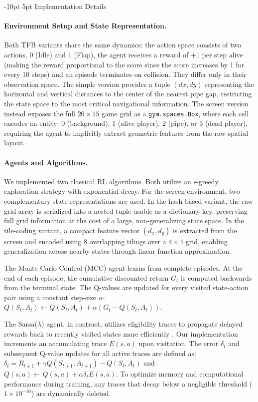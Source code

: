 \documentclass[runningheads]{llncs}
\makeatletter
\renewcommand\section{\@startsection{section}{1}{\z@}%
  {-10pt \@plus -3pt \@minus -3pt}%
  {5pt \@plus 5pt}%
  {\normalfont\large\bfseries}}
\makeatother
\begin{document}
\section{Implementation Details}
\paragraph{Environment Setup and State Representation.} Both TFB variants share the
same dynamics: the action space consists of two actions, $0$ (Idle) and $1$ (Flap),
the agent receives a reward of $+1$ per step alive (making the reward proportional to the score since the score increases by 1 for every 10 steps) and an episode terminates on
collision. They differ only in their observation space. The simple version provides
a tuple $(dx, dy)$ representing the horizontal and vertical distances to the center
of the nearest pipe gap, restricting the state space to the most critical navigational
information. The screen version instead exposes the full $20 \times 15$ game grid as
a \texttt{gym.spaces.Box}, where each cell encodes an entity: $0$ (background),
$1$ (alive player), $2$ (pipe), or $3$ (dead player), requiring the agent to
implicitly extract geometric features from the raw spatial layout. 

\paragraph{Agents and Algorithms.} We implemented two classical RL algorithms. Both utilize an $\epsilon$-greedy exploration strategy with exponential decay. For the screen environment, two complementary state representations are used. In the hash-based variant, the raw grid array is serialized into a nested tuple usable as a dictionary key, preserving full grid information at the cost of a large, non-generalizing state space. In the tile-coding variant, a compact feature vector $(d_x, d_y)$ is extracted from the screen and encoded using $8$ overlapping tilings over a $4\times4$ grid, enabling generalization across nearby states through linear function approximation.

The Monte Carlo Control (MCC) agent learns from complete episodes. At the end of each episode, the cumulative discounted return $G_t$ is computed backwards from the terminal state. The Q-values are updated for every visited state-action pair using a constant step-size $\alpha$:
$Q(S_t, A_t) \leftarrow Q(S_t, A_t) + \alpha (G_t - Q(S_t, A_t))$. 

The Sarsa($\lambda$) agent, in contrast, utilizes eligibility traces to propagate delayed rewards back to recently visited states more efficiently \cite{sutton2018reinforcement}. Our implementation increments an accumulating trace $E(s,a)$ upon visitation. The error $\delta_t$ and subsequent Q-value updates for all active traces are defined as:
$\delta_t = R_{t+1} + \gamma Q(S_{t+1}, A_{t+1}) - Q(S_t, A_t)$ and
$Q(s, a) \leftarrow Q(s, a) + \alpha \delta_t E(s, a)$.
To optimize memory and computational performance during training, any traces that decay below a negligible threshold ($1 \times 10^{-10}$) are dynamically deleted.
\end{document}
